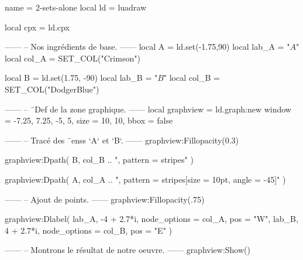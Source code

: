 \documentclass[border = 3pt]{standalone}
\begin{document}
\begin{luadraw*}{name = 2-sets-alone}
local ld = luadraw

local cpx = ld.cpx

------
-- Nos ingrédients de base.
------
local A     = ld.set(-1.75,90)
local lab_A = "$A$"
local col_A = SET_COL("Crimson")

local B     = ld.set(1.75, -90)
local lab_B = "$B$"
local col_B = SET_COL("DodgerBlue")

------
-- ¨Def de la zone graphique.
------
local graphview = ld.graph:new{
  window = {-7.25, 7.25, -5, 5},
  size   = {10, 10},
  bbox   = false
}

------
-- Tracé des ¨enss `A` et `B`.
------
graphview:Fillopacity(0.3)

graphview:Dpath(
  B,
  col_B .. ", pattern = stripes"
)

graphview:Dpath(
  A,
  col_A .. ", pattern = {stripes[size = 10pt, angle = -45]}"
)

------
-- Ajout de points.
------
graphview:Fillopacity(.75)

graphview:Dlabel(
  lab_A, -4 + 2.7*i, {node_options = col_A, pos = "W"},
  lab_B,  4 + 2.7*i, {node_options = col_B, pos = "E"}
)

------
-- Montrons le résultat de notre oeuvre.
------
graphview:Show()
\end{luadraw*}
\end{document}
